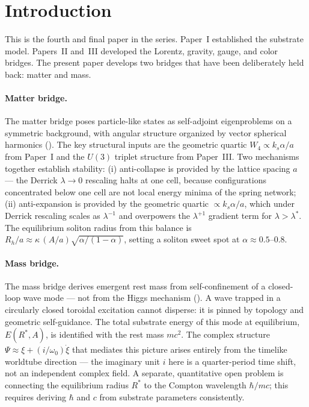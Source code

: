 \section{Introduction}
\label{sec:introduction}

This is the fourth and final paper in the series.
Paper~I established the substrate model.
Papers~II and~III developed the Lorentz, gravity, gauge, and color bridges.
The present paper develops two bridges that have been deliberately held back: matter and mass.

\paragraph{Matter bridge.}
The matter bridge poses particle-like states as self-adjoint eigenproblems on a symmetric
background, with angular structure organized by vector spherical harmonics ().
The key structural inputs are the geometric quartic $W_4\propto k_s\alpha/a$ from Paper~I and
the $U(3)$ triplet structure from Paper~III.
Two mechanisms together establish stability:
(i) anti-collapse is provided by the lattice spacing $a$ --- the Derrick $\lambda\to 0$
rescaling halts at one cell, because configurations concentrated below one cell are not local
energy minima of the spring network;
(ii) anti-expansion is provided by the geometric quartic $\propto k_s\alpha/a$, which under
Derrick rescaling scales as $\lambda^{-1}$ and overpowers the $\lambda^{+1}$ gradient term for
$\lambda > \lambda^*$.
The equilibrium soliton radius from this balance is $R_h/a \approx \kappa\,(A/a)
\sqrt{\alpha/(1-\alpha)}$, setting a soliton sweet spot at $\alpha\approx 0.5$--$0.8$.

\paragraph{Mass bridge.}
The mass bridge derives emergent rest mass from self-confinement of a closed-loop wave mode ---
not from the Higgs mechanism ().
A wave trapped in a circularly closed toroidal excitation cannot disperse: it is pinned by topology
and geometric self-guidance.
The total substrate energy of this mode at equilibrium, $E(R^*,A)$, is identified with the rest
mass $mc^2$.
The complex structure $\Psi\approx\xi+(i/\omega_0)\dot\xi$ that mediates this picture arises
entirely from the timelike worldtube direction --- the imaginary unit $i$ here is a
quarter-period time shift, not an independent complex field.
A separate, quantitative open problem is connecting the equilibrium radius $R^*$ to the Compton
wavelength $\hbar/mc$; this requires deriving $\hbar$ and $c$ from substrate parameters
consistently.

